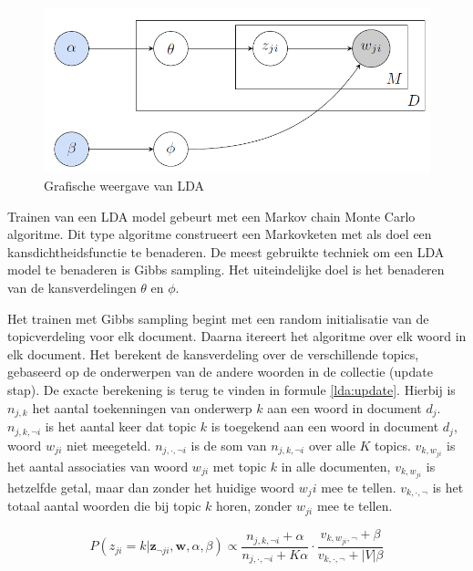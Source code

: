 \begin{figure}[tb]
    \centering
    \includegraphics[width=\linewidth]{Images/lda.png}
    \caption{Grafische weergave van LDA}
    \label{fig:lda}
\end{figure}

Trainen van een LDA model gebeurt met een Markov chain Monte Carlo algoritme. Dit type algoritme construeert een Markovketen met als doel een kansdichtheidsfunctie te benaderen. De meest gebruikte techniek om een LDA model te benaderen is Gibbs sampling. Het uiteindelijke doel is het benaderen van de kansverdelingen $\theta$ en $\phi$.

Het trainen met Gibbs sampling begint met een random initialisatie van de topicverdeling voor elk document. Daarna itereert het algoritme over elk woord in elk document. Het berekent de kansverdeling over de verschillende topics, gebaseerd op de onderwerpen van de andere woorden in de collectie (update stap). De exacte berekening is terug te vinden in formule \eqref{lda:update}. Hierbij is $n_{j,k}$ het aantal toekenningen van onderwerp $k$ aan een woord in document $d_j$. $n_{j,k,\neg i}$ is het aantal keer dat topic $k$ is toegekend aan een woord in document $d_j$, woord $w_{ji}$ niet meegeteld. $n_{j,\cdot,\neg i}$ is de som van $n_{j,k,\neg i}$ over alle $K$ topics. $v_{k,w_{ji}}$ is het aantal associaties van woord $w_{ji}$ met topic $k$ in alle documenten, $v_{k,w_{ji}}$ is hetzelfde getal, maar dan zonder het huidige woord $w_ji$ mee te tellen. $v_{k,\cdot,\neg}$ is het totaal aantal woorden die bij topic $k$ horen, zonder $w_{ji}$ mee te tellen.

\begin{equation}
    P(z_{ji} = k | \mathbf{z}_{\neg ji}, \mathbf{w}, \alpha, \beta) \propto \frac{n_{j,k,\neg i} + \alpha}{n_{j, \cdot, \neg i} + K \alpha} \cdot \frac{v_{k,w_{ji}, \neg}+ \beta}{v_{k,\cdot,\neg} + |V|\beta}
    \label{lda:update}
\end{equation}

